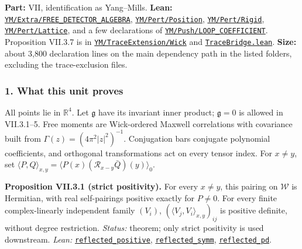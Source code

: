 \documentclass[
  letterpaper,
  11pt]{article}
\begin{document}
\textbf{Part:} VII, identification as Yang--Mills. \textbf{Lean:}
\href{https://github.com/yang-mills-group/OpenAI-YM-20261028/tree/3456e5e75cf8d4cd558955a5c7638fba2d68f464/YM/Extra/FREE_DETECTOR_ALGEBRA}{\texttt{YM/Extra/FREE\_DETECTOR\_ALGEBRA}},
\href{https://github.com/yang-mills-group/OpenAI-YM-20261028/tree/3456e5e75cf8d4cd558955a5c7638fba2d68f464/YM/Pert/Position}{\texttt{YM/Pert/Position}},
\href{https://github.com/yang-mills-group/OpenAI-YM-20261028/tree/3456e5e75cf8d4cd558955a5c7638fba2d68f464/YM/Pert/Rigid}{\texttt{YM/Pert/Rigid}},
\href{https://github.com/yang-mills-group/OpenAI-YM-20261028/tree/3456e5e75cf8d4cd558955a5c7638fba2d68f464/YM/Pert/Lattice}{\texttt{YM/Pert/Lattice}},
and a few declarations of
\href{https://github.com/yang-mills-group/OpenAI-YM-20261028/tree/3456e5e75cf8d4cd558955a5c7638fba2d68f464/YM/Push/LOOP_COEFFICIENT}{\texttt{YM/Push/LOOP\_COEFFICIENT}}.
Proposition VII.3.7 is in
\href{https://github.com/yang-mills-group/OpenAI-YM-20261028/tree/3456e5e75cf8d4cd558955a5c7638fba2d68f464/YM/TraceExtension/Wick}{\texttt{YM/TraceExtension/Wick}}
and
\href{https://github.com/yang-mills-group/OpenAI-YM-20261028/blob/3456e5e75cf8d4cd558955a5c7638fba2d68f464/TraceBridge.lean}{\texttt{TraceBridge.lean}}.
\textbf{Size:} about 3,800 declaration lines on the main dependency path
in the listed folders, excluding the trace-exclusion files.

\subsubsection{1. What this unit proves}\label{what-this-unit-proves-27}

All points lie in \(\mathbb R^4\). Let \(\mathfrak g\) have its
invariant inner product; \(\mathfrak g=0\) is allowed in VII.3.1--5.
Free moments are Wick-ordered Maxwell correlations with covariance built
from \(\Gamma(z)=(4\pi^2|z|^2)^{-1}\). Conjugation bars conjugate
polynomial coefficients, and orthogonal transformations act on every
tensor index. For \(x\ne y\), set
\(\langle P,Q\rangle_{x,y}=\langle P(x)(\mathcal R_{x-y}\bar Q)(y)\rangle_0\).

\textbf{Proposition VII.3.1 (strict positivity).} For every \(x\ne y\),
this pairing on \(\mathcal W\) is Hermitian, with real self-pairings
positive exactly for \(P\ne0\). For every finite complex-linearly
independent family \((V_i)\), \((\langle V_j,V_i\rangle_{x,y})_{ij}\) is
positive definite, without degree restriction. \emph{Status:} theorem;
only strict positivity is used downstream. \emph{Lean:}
\href{https://github.com/yang-mills-group/OpenAI-YM-20261028/blob/3456e5e75cf8d4cd558955a5c7638fba2d68f464/YM/Extra/FREE_DETECTOR_ALGEBRA/WickPositive.lean\#L47-L53}{\texttt{reflected\_positive}},
\href{https://github.com/yang-mills-group/OpenAI-YM-20261028/blob/3456e5e75cf8d4cd558955a5c7638fba2d68f464/YM/Extra/FREE_DETECTOR_ALGEBRA/WickPositive.lean\#L57-L76}{\texttt{reflected\_symm}},
\href{https://github.com/yang-mills-group/OpenAI-YM-20261028/blob/3456e5e75cf8d4cd558955a5c7638fba2d68f464/YM/Extra/FREE_DETECTOR_ALGEBRA/WickPositive.lean\#L80-L97}{\texttt{reflected\_pd}}.
\end{document}
